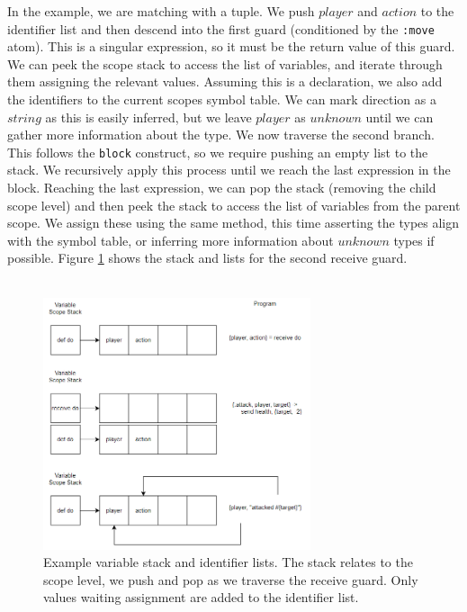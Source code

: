 In the example, we are matching with a tuple. We push $player$ and $action$ to the identifier list and then descend into the first guard (conditioned by the \texttt{:move} atom). This is a singular expression, so it must be the return value of this guard. We can peek the scope stack to access the list of variables, and iterate through them assigning the relevant values. Assuming this is a declaration, we also add the identifiers to the current scopes symbol table. We can mark direction as a $string$ as this is easily inferred, but we leave $player$ as $unknown$ until we can gather more information about the type. We now traverse the second branch. This follows the \texttt{block} construct, so we require pushing an empty list to the stack. We recursively apply this process until we reach the last expression in the block. Reaching the last expression, we can pop the stack (removing the child scope level) and then peek the stack to access the list of variables from the parent scope. We assign these using the same method, this time asserting the types align with the symbol table, or inferring more information about $unknown$ types if possible. Figure \ref{fig:scope_hierarchy2} shows the stack and lists for the second receive guard.\\ \\
\begin{figure}[h]
    \centering
    \includegraphics[width=0.7\textwidth]{images/var_stack.png}
    \caption{Example variable stack and identifier lists. The stack relates to the scope level, we push and pop as we traverse the receive guard. Only values waiting assignment are added to the identifier list.}
    \label{fig:scope_hierarchy2}
\end{figure}

